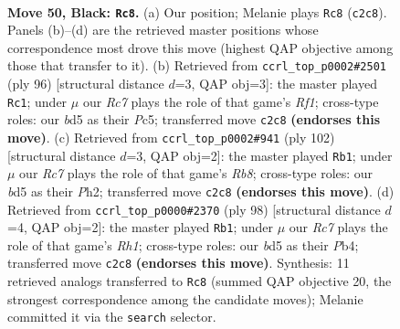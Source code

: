 \documentclass[11pt]{article}
\begin{document}
\clearpage

\begin{figure}[p]\centering
\begin{subfigure}{0.46\textwidth}\centering
\resizebox{\linewidth}{!}{%
\newchessgame
\chessboard[
  setfen={8/4k3/8/3B4/1P5R/4K3/2r5/8 b - - 0 50},
  showmover=false,
  pgfstyle=straightmove, color=movearrow, markmove={c2-c8}
]}
\caption{}
\end{subfigure}\hfill
\begin{subfigure}{0.46\textwidth}\centering
\resizebox{\linewidth}{!}{%
\newchessgame
\chessboard[
  setfen={8/2K5/4p3/2P5/6k1/4r3/8/5R2 w - - 7 49},
  showmover=false,
  pgfstyle=straightmove, color=movearrow, markmove={f1-c1}
]}
\caption{}
\end{subfigure}
\\[4pt]
\begin{subfigure}{0.46\textwidth}\centering
\resizebox{\linewidth}{!}{%
\newchessgame
\chessboard[
  setfen={1R6/r7/6K1/8/8/p1k5/7P/8 w - - 1 52},
  showmover=false,
  pgfstyle=straightmove, color=movearrow, markmove={b8-b1}
]}
\caption{}
\end{subfigure}\hfill
\begin{subfigure}{0.46\textwidth}\centering
\resizebox{\linewidth}{!}{%
\newchessgame
\chessboard[
  setfen={8/8/8/6k1/1P6/3K4/r4p2/7R w - - 0 50},
  showmover=false,
  pgfstyle=straightmove, color=movearrow, markmove={h1-b1}
]}
\caption{}
\end{subfigure}
\caption{\textbf{Move 50, Black: \texttt{Rc8}.} (a) Our position; Melanie plays \texttt{Rc8} (\texttt{c2c8}). Panels (b)--(d) are the retrieved master positions whose correspondence most drove this move (highest QAP objective among those that transfer to it). (b) Retrieved from \texttt{ccrl\_top\_p0002\#2501} (ply 96) [structural distance $d$=3, QAP obj=3]: the master played \texttt{Rc1}; under $\mu$ our \emph{Rc7} plays the role of that game's \emph{Rf1}; cross-type roles: our \emph{b}d5 as their \emph{P}c5; transferred move \texttt{c2c8} \textbf{(endorses this move)}. (c) Retrieved from \texttt{ccrl\_top\_p0002\#941} (ply 102) [structural distance $d$=3, QAP obj=2]: the master played \texttt{Rb1}; under $\mu$ our \emph{Rc7} plays the role of that game's \emph{Rb8}; cross-type roles: our \emph{b}d5 as their \emph{P}h2; transferred move \texttt{c2c8} \textbf{(endorses this move)}. (d) Retrieved from \texttt{ccrl\_top\_p0000\#2370} (ply 98) [structural distance $d$=4, QAP obj=2]: the master played \texttt{Rb1}; under $\mu$ our \emph{Rc7} plays the role of that game's \emph{Rh1}; cross-type roles: our \emph{b}d5 as their \emph{P}b4; transferred move \texttt{c2c8} \textbf{(endorses this move)}. Synthesis: 11 retrieved analogs transferred to \texttt{Rc8} (summed QAP objective 20, the strongest correspondence among the candidate moves); Melanie committed it via the \texttt{search} selector.}
\label{fig:thought-m99}
\end{figure}
\end{document}
